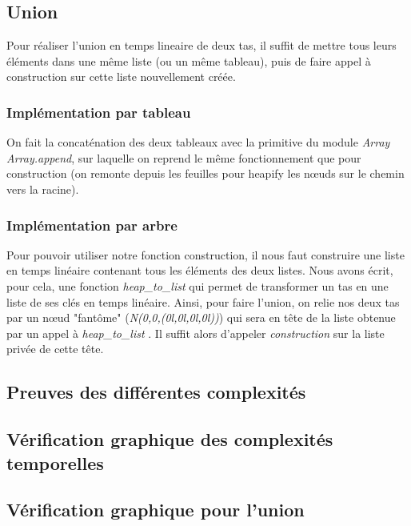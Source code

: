 \documentclass[12pt,a4paper]{article}
\begin{document}
\subsection{Union}

Pour réaliser l'union en temps lineaire de deux tas, il suffit de mettre tous leurs éléments dans une même liste (ou un même tableau), puis de faire appel à construction sur cette liste nouvellement créée.

\subsubsection{Implémentation par tableau}

On fait la concaténation des deux tableaux avec la primitive du module \textit{Array} \textit{Array.append}, sur laquelle on reprend le même fonctionnement que pour construction (on remonte depuis les feuilles pour heapify les nœuds sur le chemin vers la racine).


\subsubsection{Implémentation par arbre}

Pour pouvoir utiliser notre fonction construction, il nous faut construire une liste en temps linéaire contenant tous les éléments des deux listes. Nous avons écrit, pour cela, une fonction \textit{heap\_to\_list} qui permet de transformer un tas en une liste de ses clés en temps linéaire. Ainsi, pour faire l'union, on relie nos deux tas par un nœud "fantôme" (\textit{N(0,0,(0l,0l,0l,0l))}) qui sera en tête de la liste obtenue par un appel à \textit{heap\_to\_list} . Il suffit alors d'appeler \textit{construction} sur la liste privée de cette tête.


\subsection{Preuves des différentes complexités}


\subsection{Vérification graphique des complexités temporelles}

\subsection{Vérification graphique pour l'union}
\end{document}
